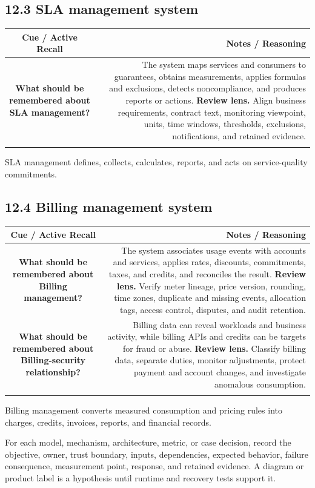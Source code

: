\documentclass[11pt]{article}
\newcommand{\CornellHeader}{\rowcolor{Navy}\color{white}\bfseries Cue / Active Recall & \color{white}\bfseries Notes / Reasoning \\\endhead}
\newcommand{\CornellRow}[2]{\cellcolor{CueGray}\textbf{#1} & #2 \\\addlinespace[3pt]}
\begin{document}
\subsection{12.3 SLA management system}
\begin{longtable}{@{}C N@{}}
\CornellHeader
\CornellRow{What should be remembered about SLA management?}{The system maps services and consumers to guarantees, obtains measurements, applies formulas and exclusions, detects noncompliance, and produces reports or actions. \textbf{Review lens.} Align business requirements, contract text, monitoring viewpoint, units, time windows, thresholds, exclusions, notifications, and retained evidence.}
\end{longtable}
\begin{sectionsummarybox}
SLA management defines, collects, calculates, reports, and acts on service-quality commitments.
\end{sectionsummarybox}
\subsection{12.4 Billing management system}
\begin{longtable}{@{}C N@{}}
\CornellHeader
\CornellRow{What should be remembered about Billing management?}{The system associates usage events with accounts and services, applies rates, discounts, commitments, taxes, and credits, and reconciles the result. \textbf{Review lens.} Verify meter lineage, price version, rounding, time zones, duplicate and missing events, allocation tags, access control, disputes, and audit retention.}
\CornellRow{What should be remembered about Billing-security relationship?}{Billing data can reveal workloads and business activity, while billing APIs and credits can be targets for fraud or abuse. \textbf{Review lens.} Classify billing data, separate duties, monitor adjustments, protect payment and account changes, and investigate anomalous consumption.}
\end{longtable}
\begin{sectionsummarybox}
Billing management converts measured consumption and pricing rules into charges, credits, invoices, reports, and financial records.
\end{sectionsummarybox}
\begin{practicebox}
For each model, mechanism, architecture, metric, or case decision, record the objective, owner, trust boundary, inputs, dependencies, expected behavior, failure consequence, measurement point, response, and retained evidence. A diagram or product label is a hypothesis until runtime and recovery tests support it.
\end{practicebox}
\end{document}
